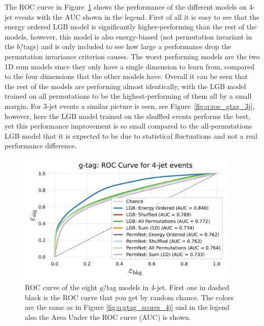 The ROC curve in Figure~\ref{fig:q:roc_gtag_4j_non_appendix} shows the performance of the different models on 4-jet events with the AUC shown in the legend. First of all it is easy to see that the energy ordered LGB model is significantly higher-performing than the rest of the models, however, this model is also energy-biased (not permutation invariant in the $b$\=/tags) and is only included to see how large a performance drop the permutation invariance criterion causes. The worst performing models are the two 1D sum models since they only have a single dimension to learn from, compared to the four dimensions that the other models have. Overall it can be seen that the rest of the models are performing almost identically, with the LGB model trained on all permutations to be the highest-performing of them all by a small margin. 
For 3-jet events a similar picture is seen, see Figure~\ref{fig:q:roc_gtag_3j}, however, here the LGB model trained on the shuffled events performs the best, yet this performance improvement is so small compared to the all-permutations LGB model that it is expected to be due to statistical fluctuations and not a real performance difference. 

\begin{figure}[h!]
  \centerfloat
  \includegraphics[width=0.95\textwidth, trim=10 10 10 40, clip]{figures/quarks/gtag_ROC_4_jet-down_sample=1.00-ML_vars=vertex-selection=b-ejet_min=4-n_iter_RS_lgb=99-n_iter_RS_xgb=9-cdot_cut=0.90-version=19.pdf}
  \caption[ROC Curve for $g$\=/Tag in 4-Jet Events]
          {\label{fig:q:roc_gtag_4j_non_appendix}ROC curve of the eight $g$\=/tag models in 4-jet. First one in dashed black is the ROC curve that you get by random chance. The colors are the same as in 
          Figure \ref{fig:q:gtag_scores_4j} 
          and in the legend also the Area Under the ROC curve (AUC) is shown.} 
\end{figure}

